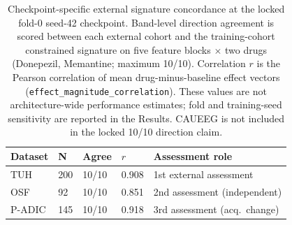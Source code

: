 \begin{table}[!t]
\centering
\caption{Checkpoint-specific external signature concordance at the locked fold-0
seed-42 checkpoint. Band-level direction agreement is scored between each
external cohort and the training-cohort constrained signature on five feature
blocks $\times$ two drugs (Donepezil, Memantine; maximum 10/10).
Correlation $r$ is the Pearson correlation of mean drug-minus-baseline effect
vectors (\texttt{effect\_magnitude\_correlation}). These values are not
architecture-wide performance estimates; fold and training-seed sensitivity
are reported in the Results. CAUEEG is not included in the locked
10/10 direction claim.}
\label{tab:direction-agreement}
\setlength{\tabcolsep}{4pt}
\begin{tabular}{@{}llllp{4.6cm}@{}}
\toprule
Dataset & N & Agree & $r$ & Assessment role \\
\midrule
  TUH & 200 & 10/10 & 0.908 & 1st external assessment \\
  OSF & 92 & 10/10 & 0.851 & 2nd assessment (independent) \\
  P-ADIC & 145 & 10/10 & 0.918 & 3rd assessment (acq.\ change) \\
\bottomrule
\end{tabular}
\end{table}
